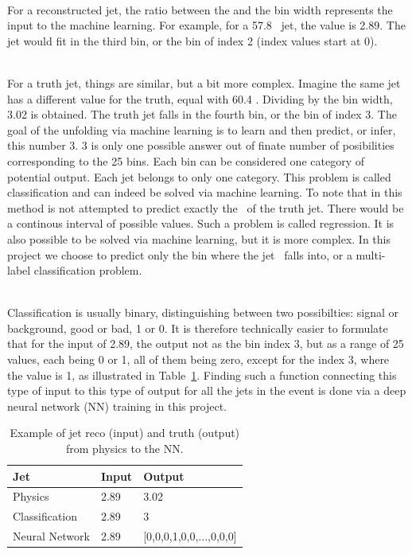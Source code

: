 \ \\For a reconstructed jet, the ratio between the \pt and the bin width represents the input to the machine learning. For example, for a 57.8 \GeV~jet, the value is 2.89. The jet would fit in the third bin, or the bin of index 2 (index values start at 0).

\ \\For a truth jet, things are similar, but a bit more complex. Imagine the same jet has a different value for the truth, equal with 60.4 \GeV. Dividing by the bin width, 3.02 is obtained. The truth jet falls in the fourth bin, or the bin of index 3. The goal of the unfolding via machine learning is to learn and then predict, or infer, this number 3. 3 is only one possible answer out of finate number of posibilities corresponding to the 25 bins. Each bin can be considered one category of potential output. Each jet belongs to only one category. This problem is called classification and can indeed be solved via machine learning. To note that in this method is not attempted to predict exactly the \pt~of the truth jet. There would be a continous interval of possible values. Such a problem is called regression. It is also possible to be solved via machine learning, but it is more complex. In this project we choose to predict only the bin where the jet \pt~falls into, or a multi-label classification problem.

\ \\Classification is usually binary, distinguishing between two possibilties: signal or background, good or bad, 1 or 0. It is therefore technically easier to formulate that for the input of 2.89, the output not as the bin index 3, but as a range of 25 values, each being 0 or 1, all of them being zero, except for the index 3, where the value is 1, as illustrated in Table~\ref{tab:InputOutput}. Finding such a function connecting this type of input to this type of output for all the jets in the event is done via a deep neural network (NN) training in this project.

\begin{table}[h!]
  \centering
    \begin{tabular}{|l|l|l|} %
      \hline
      \textbf{Jet} & \textbf{Input} & \textbf{Output}\\
      \hline
      Physics & 2.89 & 3.02 \\
      Classification & 2.89 & 3 \\
      Neural Network & 2.89 & [0,0,0,1,0,0,...,0,0,0] \\
      \hline
    \end{tabular}
\caption {Example of jet reco (input) and truth (output) from physics to the NN.}
\label{tab:InputOutput}
\end{table}

